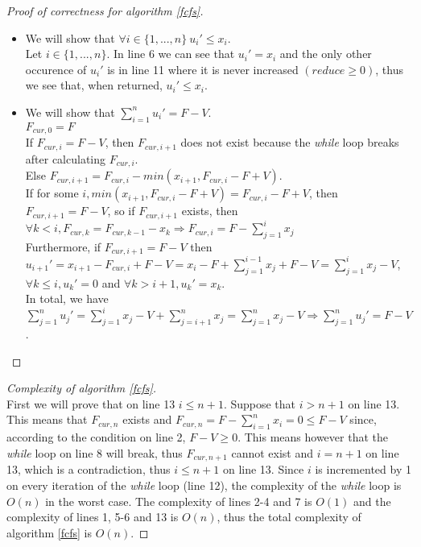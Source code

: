 \documentclass[11pt]{article}
\theoremstyle{definition}
\theoremstyle{corollary}
\begin{document}
    \begin{proof}[Proof of correctness for algorithm \ref{fcfs}] \
       \begin{itemize}
          \item We will show that $\forall i \in \{1,...,n\} \: u_i' \leq x_i$. \\
          Let $i \in \{1,...,n\}$. In line 6 we can see that $u_i' = x_i$ and the only other occurence of $u_i'$
          is in line 11 where it is never increased $(reduce \geq 0)$, thus we see that, when returned, $u_i' \leq x_i$.
          \item We will show that $\sum\limits_{i=1}^{n}u_i' = F - V$. \\
          $F_{cur,0} = F$ \\
          If $F_{cur,i} = F - V$, then $F_{cur,i+1}$ does not exist because the \emph{while} loop breaks after calculating
          $F_{cur,i}$. \\
          Else $F_{cur,i+1} = F_{cur,i} - min(x_{i+1}, F_{cur,i} - F + V)$. \\
          If for some $i, min(x_{i+1}, F_{cur,i} - F + V) = F_{cur,i} - F + V$, then $F_{cur,i+1} = F - V$, so if
          $F_{cur,i+1}$ exists, then $\forall k < i, F_{cur,k} = F_{cur,k-1} - x_k \Rightarrow F_{cur,i} =
          F - \sum\limits_{j=1}^{i}x_j$ \\
          Furthermore, if $F_{cur,i+1} = F - V$ then $u_{i+1}' = x_{i+1} - F_{cur,i} + F - V =
          x_i - F + \sum\limits_{j=1}^{i-1}x_j + F - V = \sum\limits_{j=1}^{i}x_j - V$, $\forall k \leq i, u_k' = 0$
          and $\forall k > i+1, u_k' = x_k$. \\
          In total, we have $\sum\limits_{j=1}^{n}u_j' = \sum\limits_{j=1}^{i}x_j - V + \sum\limits_{j=i+1}^{n}x_j =
          \sum\limits_{j=1}^{n}x_j - V \Rightarrow \sum\limits_{j=1}^{n}u_j' = F - V$.
       \end{itemize}
    \end{proof}
    \begin{proof}[Complexity of algorithm \ref{fcfs}] \ \\
       First we will prove that on line 13 $i \leq n+1$. Suppose that $i > n+1$ on line 13. This means that $F_{cur,n}$
       exists and $F_{cur,n} = F - \sum\limits_{i=1}^{n}x_i = 0 \leq F - V$ since, according to the condition on line 2,
       $F - V \geq 0$. This means however that the \emph{while} loop on line 8 will break, thus $F_{cur,n+1}$ cannot exist
       and $i = n + 1$ on line 13, which is a contradiction, thus $i \leq n+1$ on line 13. Since $i$ is incremented by 1
       on every iteration of the \emph{while} loop (line 12), the complexity of the \emph{while} loop is $O(n)$ in the
       worst case. The complexity of lines 2-4 and 7 is $O(1)$ and the complexity of lines 1, 5-6 and 13 is $O(n)$, thus
       the total complexity of algorithm \ref{fcfs} is $O(n)$.
    \end{proof}
\end{document}
